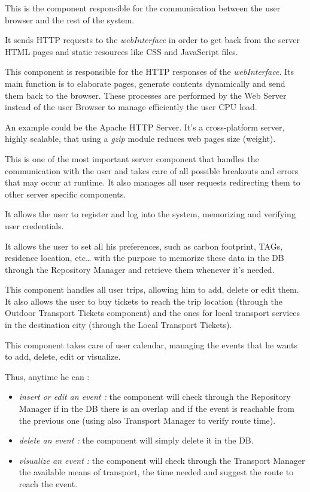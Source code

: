 This is the component responsible for the communication between the user browser and the rest of the system.\par
It sends HTTP requests to the \emph{webInterface} in order to get back from the server HTML pages and static resources like CSS and JavaScript files.

This component is responsible for the HTTP responses of the \emph{webInterface}. Its main function is to elaborate pages, generate contents dynamically and send them back to the browser. These processes are performed by the Web Server instead of the user Browser to manage efficiently the user CPU load.\par
An example could be the Apache HTTP Server. It’s a cross-platform server, highly scalable, that using a \emph{gzip} module reduces web pages size (weight).

This is one of the most important server component that handles the communication with the user and takes care of all possible breakouts and errors that may occur at runtime. It also manages all user requests redirecting them to other server specific components.

It allows the user to register and log into the system, memorizing and verifying user credentials.

It allows the user to set all his preferences, such as carbon footprint, TAGs, residence location, etc… with the purpose to memorize these data in the DB through the Repository Manager and retrieve them whenever it's needed.

This component handles all user trips, allowing him to add, delete or edit them. It also allows the user to buy tickets to reach the trip location (through the Outdoor Transport Tickets component) and the ones for local transport services in the destination city (through the Local Transport Tickets).

This component takes care of user calendar, managing the events that he wants to add, delete, edit or visualize.\par
Thus, anytime he can :
\begin{itemize}
	\setlength{\leftskip}{1cm}
	\item \emph{insert or edit an event :} the component will check through the Repository Manager if in the DB there is an overlap and if the event is reachable from the previous one (using also Transport Manager to verify route time).
	\item \emph{delete an event :} the component will simply delete it in the DB.
	\item \emph{visualize an event :} the component will check through the Transport Manager the available means of transport, the time needed and suggest the route to reach the event.
\end{itemize}

